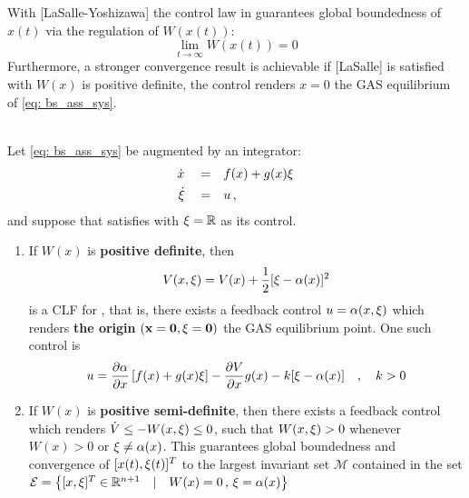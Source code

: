\documentclass[12pt]{ucthesis}
\begin{document}
With [LaSalle-Yoshizawa] the control law in  guarantees global boundedness of $x(t)$ via the regulation of $W(x(t))$:
	$$ \lim\limits_{t\to\infty} W(x(t)) = 0 $$
Furthermore, a stronger convergence result is achievable if [LaSalle] is satisfied with $W(x)$ is positive definite, the control renders $x=0$ the GAS equilibrium of \autoref{eq: bs_ass_sys}.

\begin{lem}[Backstepping] \alignright \citet[Lem. 2.8]{Krstic95} \label{lem: bs} \\
Let \autoref{eq: bs_ass_sys} be augmented by an integrator:
	\begin{subequations} \label{eq: lem_bs_sys}%
		\begin{align}
			\label{eq: lem_bs_sys_a} \dot{x} 	\quad =& \quad f(x) + g(x)\xi \\
			\label{eq: lem_bs_sys_b}\dot{\xi} \quad =& \quad u \,,
		\end{align}
	\end{subequations}
and suppose that  satisfies  with $\xi = \mathbb{R}$ as its control.
%
	\begin{enumerate}[noitemsep,nosep,labelindent=\parindent,leftmargin=\parindent]%
	\renewcommand{\labelenumi}{\roman{enumi}) }
	\item{If $W(x)$ is \textbf{positive definite}, then
		\begin{equation} \label{eq: bs_lem_w}
			V(x,\xi)= V(x) + \frac{1}{2}[\xi - \alpha(x)]^2
		\end{equation}
	is a CLF for , that is, there exists a feedback control $u=\alpha(x,\xi)$ which renders \textbf{the origin} $\mathbf{(x=0,\xi=0)}$ the GAS equilibrium point. One such control is
		\begin{equation} \label{eq: bs_lem_u}
			u = \pd{\stab}{x}\left[ f(x)+g(x)\virt \right] - \pd{V}{x}g(x) - k[\virt - \stab(x)] \quad,\quad k>0 %
		\end{equation}}
	\item{If $W(x)$ is \textbf{positive semi-definite}, then there exists a feedback control which renders $\dot{V} \leq -W(x,\xi) \leq 0$, such that $W(x,\xi) > 0$ whenever $W(x)>0$ or $\xi \neq \alpha(x)$. This guarantees global boundedness and convergence of $[x(t),\xi(t)]^T$ to the largest invariant set $\mathcal{M}$ contained in the set $\mathcal{E} = \left\lbrace [x,\xi]^T \in \mathbb{R}^{n+1} \quad|\quad W(x)=0 \,,\, \xi = \alpha(x) \right\rbrace $}
	\end{enumerate}
\end{lem}
\end{document}
